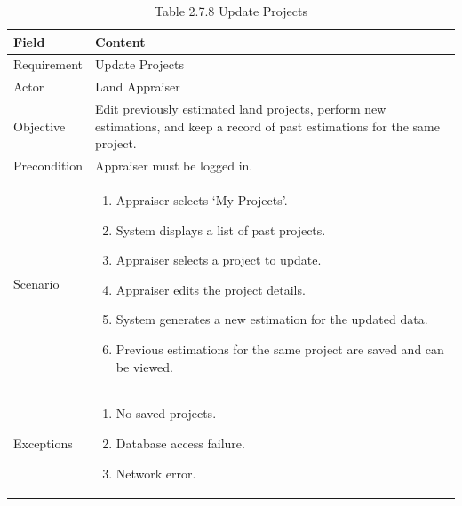 \documentclass[12pt,oneside]{report}
\begin{document}
\begin{table}[H]
\centering
\caption{Table 2.7.8 Update Projects}
\label{tab:req-update-projects}
\begin{tabularx}{\textwidth}{|p{3cm}|X|}
\hline
\textbf{Field} & \textbf{Content} \\ \hline

Requirement & Update Projects \\ \hline

Actor & Land Appraiser \\ \hline

Objective & Edit previously estimated land projects, perform new estimations, and keep a record of past estimations for the same project. \\ \hline

Precondition & Appraiser must be logged in. \\ \hline

Scenario & 
\begin{minipage}[t]{0.75\textwidth}
\begin{enumerate}[leftmargin=*,label=\arabic*.]
\item Appraiser selects ‘My Projects’.
\item System displays a list of past projects.
\item Appraiser selects a project to update.
\item Appraiser edits the project details.
\item System generates a new estimation for the updated data.
\item Previous estimations for the same project are saved and can be viewed.
\end{enumerate}
\end{minipage} \\ \hline

Exceptions & 
\begin{minipage}[t]{0.75\textwidth}
\begin{enumerate}[leftmargin=*,label=\arabic*.]
\item No saved projects.
\item Database access failure.
\item Network error.
\end{enumerate}
\end{minipage} \\ \hline
\end{tabularx}
\end{table}
\end{document}
